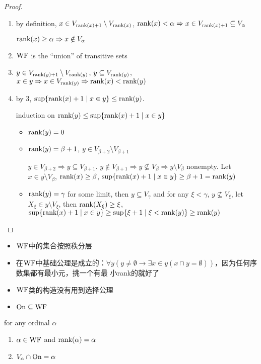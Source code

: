 \documentclass[11pt]{article}
\begin{document}
\begin{proof}
\begin{enumerate}
\item by definition, \(x\in V_{\text{rank}(x)+1}\setminus V_{\text{rank}(x)}\), \(\text{rank}(x)<\alpha\Rightarrow x\in V_{\text{rank}(x)+1}\subseteq V_\alpha\)

\(\text{rank}(x)\ge\alpha\Rightarrow x\notin V_\alpha\)

\item \(\operatorname{WF}\) is the ``union'' of transitive sets

\item \(y\in V_{\text{rank}(y)+1}\setminus V_{\text{rank}(y)}\), \(y\subseteq V_{\text{rank}(y)}\), \(x\in y\Rightarrow x\in V_{\text{rank}(y)}\Rightarrow\text{rank}(x)<\text{rank}(y)\)

\item by 3, \(\sup\{\text{rank}(x)+1\mid x\in y\}\le\text{rank}(y)\).

induction on \(\text{rank}(y)\le\sup\{\text{rank}(x)+1\mid x\in y\}\)
\begin{itemize}
\item \(\text{rank}(y)=0\)
\item \(\text{rank}(y)=\beta+1\), \(y\in V_{\beta+2}\setminus V_{\beta+1}\)

\(y\in V_{\beta+2}\Rightarrow y\subseteq V_{\beta+1}\). \(y\notin V_{\beta+1}\Rightarrow y\not\subseteq V_{\beta}\Rightarrow y\setminus V_\beta\) nonempty.
Let \(x\in y\setminus V_\beta\), \(\text{rank}(x)\ge\beta\), \(\sup\{\text{rank}(x)+1\mid x\in y\}\ge\beta+1=\text{rank}(y)\)
\item \(\text{rank}(y)=\gamma\) for some limit, then \(y\subseteq V_\gamma\) and for any \(\xi<\gamma\), \(y\not\subseteq V_\xi\),
let \(X_\xi\in y\setminus V_\xi\), then \(\text{rank}(X_\xi)\ge\xi\), \(\sup\{\text{rank}(x)+1\mid x\in y\}\ge\sup\{\xi+1\mid\xi<\text{rank}(y)\}\ge\text{rank}(y)\)
\end{itemize}
\end{enumerate}
\end{proof}

\begin{itemize}
\item \(\operatorname{WF}\)中的集合按照秩分层
\item 在\(\operatorname{WF}\)中基础公理是成立的：\(\forall y(y\neq\emptyset\to\exists x\in y(x\cap y=\emptyset))\)，因为任何序数集都有最小元，挑一个有最
小rank的就好了
\item \(\operatorname{WF}\)类的构造没有用到选择公理
\item \(\operatorname{On}\subseteq\operatorname{WF}\)
\end{itemize}


\begin{lemma}[]
for any ordinal \(\alpha\)
\begin{enumerate}
\item \(\alpha\in\operatorname{WF}\) and \(\text{rank}(\alpha)=\alpha\)
\item \(V_\alpha\cap\operatorname{On}=\alpha\)
\end{enumerate}
\end{lemma}
\end{document}
